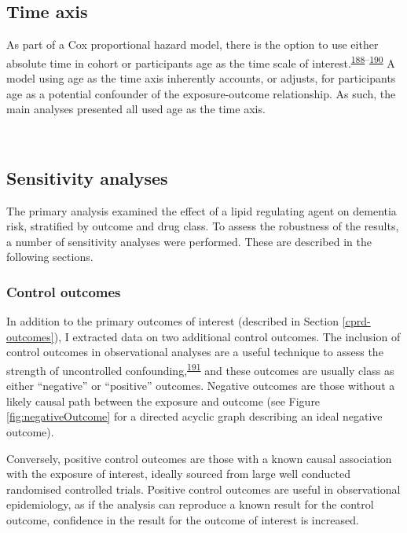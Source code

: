 \documentclass[a4paper, twoside]{templates/ociamthesis}
\begin{document}
\hypertarget{time-axis}{%
\subsection{Time axis}\label{time-axis}}

As part of a Cox proportional hazard model, there is the option to use either absolute time in cohort or participants age as the time scale of interest.\textsuperscript{\protect\hyperlink{ref-lamarca1998}{188}--\protect\hyperlink{ref-pencina2007}{190}} A model using age as the time axis inherently accounts, or adjusts, for participants age as a potential confounder of the exposure-outcome relationship. As such, the main analyses presented all used age as the time axis.

~

\hypertarget{sensitivity-analyses-1}{%
\subsection{Sensitivity analyses}\label{sensitivity-analyses-1}}

The primary analysis examined the effect of a lipid regulating agent on dementia risk, stratified by outcome and drug class. To assess the robustness of the results, a number of sensitivity analyses were performed. These are described in the following sections.

\hypertarget{control-outcomes}{%
\subsubsection{Control outcomes}\label{control-outcomes}}

In addition to the primary outcomes of interest (described in Section \ref{cprd-outcomes}), I extracted data on two additional control outcomes. The inclusion of control outcomes in observational analyses are a useful technique to assess the strength of uncontrolled confounding,\textsuperscript{\protect\hyperlink{ref-lipsitch2010}{191}} and these outcomes are usually class as either ``negative'' or ``positive'' outcomes. Negative outcomes are those without a likely causal path between the exposure and outcome (see Figure \ref{fig:negativeOutcome} for a directed acyclic graph describing an ideal negative outcome).

Conversely, positive control outcomes are those with a known causal association with the exposure of interest, ideally sourced from large well conducted randomised controlled trials. Positive control outcomes are useful in observational epidemiology, as if the analysis can reproduce a known result for the control outcome, confidence in the result for the outcome of interest is increased.
\end{document}
